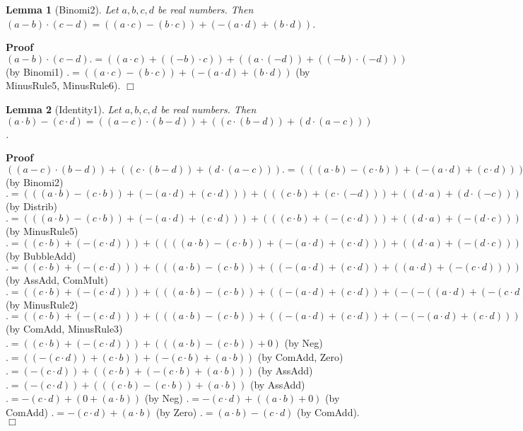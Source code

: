 \documentclass{article}
\newenvironment{forthel}{\begin{leftbar}}{\end{leftbar}}
\newenvironment{proof}{\noindent\textbf{Proof\ }}{\hspace*{\fill}$\Box$\medskip}
\newtheorem{lemma}{Lemma}
\begin{document}
\begin{forthel}
	\begin{lemma}[Binomi2]
	Let $a,b,c,d$ be real numbers.
	Then $(a - b) \cdot (c - d) = ((a \cdot c) - (b \cdot c)) + (-(a \cdot d) + (b \cdot d))$.
	\end{lemma}
	\begin{proof}
	$(a - b) \cdot (c - d) .= ((a \cdot c) + ((-b) \cdot c)) + ((a \cdot (-d)) + ((-b) \cdot (-d)))$ (by Binomi1)
	$.= ((a \cdot c) - (b \cdot c)) + (-(a \cdot d) + (b \cdot d))$ (by MinusRule5, MinusRule6).
	\end{proof}
	
	
	
	\begin{lemma}[Identity1]
	Let $a,b,c,d$ be real numbers. 
	Then $(a \cdot b) - (c \cdot d) = ((a - c) \cdot (b - d)) + ((c \cdot (b - d)) + (d \cdot (a - c)))$.
	\end{lemma}
	\begin{proof}
	$((a - c) \cdot (b - d)) + ((c \cdot (b - d)) + (d \cdot (a - c))) 
	.= (((a \cdot b) - (c \cdot b)) + (-(a \cdot d) + (c \cdot d))) + ((c \cdot (b - d)) + (d \cdot (a - c)))$ (by Binomi2)
	$.= (((a \cdot b) - (c \cdot b)) + (-(a \cdot d) + (c \cdot d))) + (((c \cdot b) + (c \cdot (-d))) + ((d \cdot a) + (d \cdot (-c))))$ (by Distrib)
	$.= (((a \cdot b) - (c \cdot b)) + (-(a \cdot d) + (c \cdot d))) + (((c \cdot b) + (-(c \cdot d))) + ((d \cdot a) + (-(d \cdot c))))$ (by MinusRule5)
	$.= ((c \cdot b) + (-(c \cdot d))) + ((((a \cdot b) - (c \cdot b)) + (-(a \cdot d) + (c \cdot d))) + ((d \cdot a) + (-(d \cdot c))))$ (by BubbleAdd)
	$.= ((c \cdot b) + (-(c \cdot d))) + (((a \cdot b) - (c \cdot b)) + ((-(a \cdot d) + (c \cdot d)) + ((a \cdot d) + (-(c \cdot d)))))$ (by AssAdd, ComMult)
	$.= ((c \cdot b) + (-(c \cdot d))) + (((a \cdot b) - (c \cdot b)) + ((-(a \cdot d) + (c \cdot d)) + (-(-((a \cdot d) + (-(c \cdot d)))))))$ (by MinusRule2)
	$.= ((c \cdot b) + (-(c \cdot d))) + (((a \cdot b) - (c \cdot b)) + ((-(a \cdot d) + (c \cdot d)) + (-(-(a \cdot d) + (c \cdot d)))))$ (by ComAdd, MinusRule3)
	$.= ((c \cdot b) + (-(c \cdot d))) + (((a \cdot b) - (c \cdot b)) + 0)$ (by Neg)
	$.= ((-(c \cdot d)) + (c \cdot b)) + (-(c \cdot b) + (a \cdot b))$ (by ComAdd, Zero)
	$.= (-(c \cdot d)) + ((c \cdot b) + (-(c \cdot b) + (a \cdot b)))$ (by AssAdd)
	$.= (-(c \cdot d)) + (((c \cdot b) -(c \cdot b)) + (a \cdot b))$ (by AssAdd)
	$.= -(c \cdot d) + (0 + (a \cdot b))$ (by Neg)
	$.= -(c \cdot d) + ((a \cdot b) + 0)$ (by ComAdd)
	$.= -(c \cdot d) + (a \cdot b)$ (by Zero)
	$.= (a \cdot b) - (c \cdot d)$ (by ComAdd).
	\end{proof}
	

\end{forthel}
\end{document}
